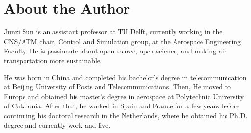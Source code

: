 \chapter*{About the Author}

Junzi Sun is an assistant professor at TU Delft, currently working in the CNS/ATM chair, Control and Simulation group, at the Aerospace Engineering Faculty. He is passionate about open-source, open science, and making air transportation more sustainable.

He was born in China and completed his bachelor’s degree in telecommunication at Beijing University of Posts and Telecommunications. Then, He moved to Europe and obtained his master’s degree in aerospace at Polytechnic University of Catalonia. After that, he worked in Spain and France for a few years before continuing his doctoral research in the Netherlands, where he obtained his Ph.D. degree and currently work and live.

